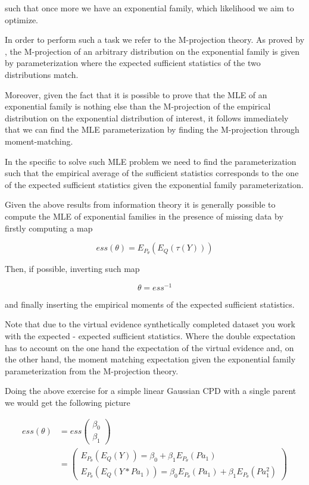 \documentclass[11pt]{article}
\begin{document}
\begin{article}
such that once more we have an exponential family, which likelihood
we aim to optimize.

In order to perform such a task we refer to the M-projection
theory. As proved by \cite{koller2009probabilistic}, the M-projection
of an arbitrary distribution on the exponential family is given by
parameterization where the expected sufficient statistics of the
two distributions match.

Moreover, given the fact that it is possible to prove that the MLE
of an exponential family is nothing else than the M-projection of
the empirical distribution on the exponential distribution of
interest, it follows immediately that we can find the MLE
parameterization by finding the M-projection through
moment-matching.

In the specific to solve such MLE problem we need to find the
parameterization such that the empirical average of the sufficient
statistics corresponds to the one of the expected sufficient
statistics given the exponential family parameterization.

Given the above results from information theory it is generally
possible to compute the MLE of exponential families in the presence
of missing data by firstly computing a map

$$ess(\theta) = E_{P_\theta}(E_Q(\tau(Y)))$$

Then, if possible, inverting such map

$$\theta = ess^{-1}$$

and finally inserting the empirical moments of the expected
sufficient statistics.

Note that due to the virtual evidence synthetically completed
dataset you work with the expected - expected sufficient
statistics. Where the double expectation has to account on the one
hand the expectation of the virtual evidence and, on the other
hand, the moment matching expectation given the exponential family
parameterization from the M-projection theory. 

Doing the above exercise for a simple linear Gaussian CPD with a
single parent we would get the following picture

 \begin{align*}
 ess (\theta) &= ess\begin{pmatrix}
                 \beta_0\\
		 \beta_1
		 \end{pmatrix} \\
		 &= \begin{pmatrix}
		 E_{P_\theta}(E_Q(Y)) = \beta_0 + \beta_1 E_{P_\theta}(Pa_1) \\
		 E_{P_\theta}(E_Q(Y * Pa_1)) = \beta_0 E_{P_\theta}(Pa_1) + \beta_1 E_{P_\theta}(Pa_1^2)
		 \end{pmatrix}
\end{align*}



\end{article}
\end{document}
